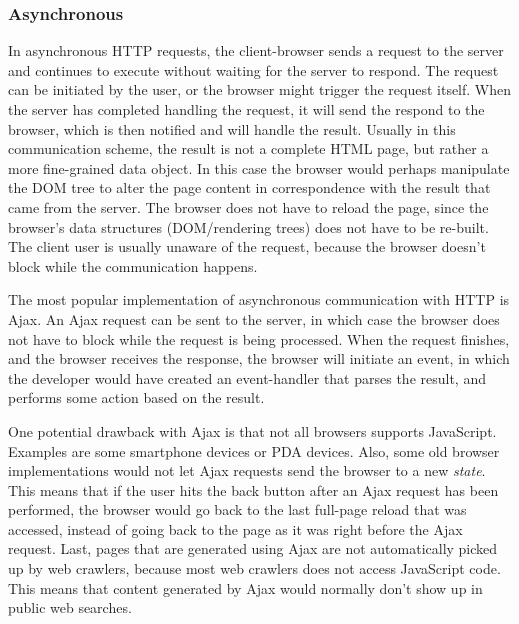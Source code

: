 \subsubsection{Asynchronous}
In asynchronous HTTP requests, the client-browser sends a request to the server and continues to execute without waiting for the server to respond. The request can be initiated by the user, or the browser might trigger the request itself. When the server has completed handling the request, it will send the respond to the browser, which is then notified and will handle the result. Usually in this communication scheme, the result is not a complete HTML page, but rather a more fine-grained data object. In this case the browser would perhaps manipulate the DOM tree to alter the page content in correspondence with the result that came from the server. The browser does not have to reload the page, since the browser's data structures (DOM/rendering trees) does not have to be re-built. The client user is usually unaware of the request, because the browser doesn't block while the communication happens.

The most popular implementation of asynchronous communication with HTTP is Ajax. An Ajax request can be sent to the server, in which case the browser does not have to block while the request is being processed. When the request finishes, and the browser receives the response, the browser will initiate an event, in which the developer would have created an event-handler that parses the result, and performs some action based on the result.  

One potential drawback with Ajax is that not all browsers supports JavaScript. Examples are some smartphone devices or PDA devices. Also, some old browser implementations would not let Ajax requests send the browser to a new \textit{state}. This means that if the user hits the back button after an Ajax request has been performed, the browser would go back to the last full-page reload that was accessed, instead of going back to the page as it was right before the Ajax request. Last, pages that are generated using Ajax are not automatically picked up by web crawlers, because most web crawlers does not access JavaScript code. This means that content generated by Ajax would normally don't show up in public web searches. 

